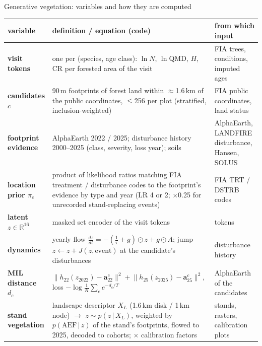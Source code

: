\begin{frame}{Generative vegetation: variables and how they are computed}
\scriptsize
\renewcommand{\arraystretch}{1.07}
\begin{tabularx}{\textwidth}{@{}>{\bfseries}p{2.4cm}X>{\raggedright\arraybackslash}p{3.7cm}@{}}
\toprule
variable & definition / equation (code) & from which input \\
\midrule
visit tokens & one per (species, age class): $\ln N$, $\ln$QMD, $H$, CR per forested area of the visit & FIA trees, conditions, imputed ages \\
candidates $c$ & 90\,m footprints of forest land within $\approx$1.6\,km of the public coordinates, $\le$256 per plot (stratified, inclusion-weighted) & FIA public coordinates, land status \\
footprint evidence & AlphaEarth 2022 / 2025; disturbance history 2000–2025 (class, severity, loss year); soils & AlphaEarth, LANDFIRE disturbance, Hansen, SOLUS \\
location prior $\pi_c$ & product of likelihood ratios matching FIA treatment / disturbance codes to the footprint's evidence by type and year (LR 4 or 2; $\times$0.25 for unrecorded stand-replacing events) & FIA TRT / DSTRB codes \\
latent $z\in\mathbb R^{16}$ & masked set encoder of the visit tokens & tokens \\
dynamics & yearly flow $\frac{dz}{dt}=-(\frac1\tau+g)\odot z+g\odot A$; jump $z\leftarrow z+J(z,\text{event})$ at the candidate's disturbances & disturbance history \\
MIL distance $d_c$ & $\lVert h_{22}(z_{2022})-\mathbf a^c_{22}\rVert^2+\lVert h_{25}(z_{2025})-\mathbf a^c_{25}\rVert^2$, loss $-\log\frac1K\sum_c e^{-d_c/T}$ & AlphaEarth of the candidates \\
stand vegetation & landscape descriptor $X_L$ (1.6\,km disk / 1\,km node) $\rightarrow$ $z\sim p(z\,|\,X_L)$, weighted by $p(\text{AEF}\,|\,z)$ of the stand's footprints, flowed to 2025, decoded to cohorts; $\times$ calibration factors & stands, rasters, calibration plots \\
\bottomrule
\end{tabularx}
\end{frame}
